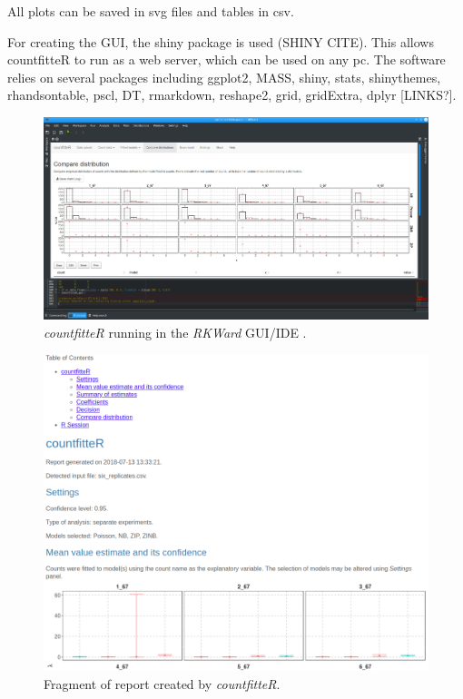 All plots can be saved in svg files and tables in csv.

For creating the GUI, the shiny package is used (SHINY CITE). This allows countfitteR to run as a web server, which can be used on any pc. The software relies on several packages including ggplot2, MASS, shiny, stats, shinythemes, rhandsontable, pscl, DT, rmarkdown, reshape2, grid, gridExtra, dplyr [LINKS?].

\begin{figure}[htbp]
  \centering
  \includegraphics[width=0.99\columnwidth]{fig_gui}
  \caption{\emph{countfitteR} running in the \emph{RKWard} GUI/IDE \citep{rodiger_rkward:_2012}.}
  \label{figure:fig_gui.png}
\end{figure}

\begin{figure}[htbp]
  \centering
  \includegraphics[width=0.99\columnwidth]{cj_rep}
  \caption{Fragment of report created by \emph{countfitteR}.}
  \label{figure:cj_rep.png}
\end{figure}


